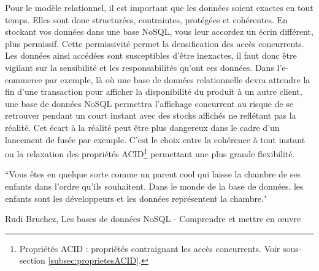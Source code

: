 Pour le modèle relationnel, il est important que les données soient exactes en tout temps. Elles sont donc structurées, contraintes, protégées et cohérentes. En stockant vos données dans une base NoSQL, vous leur accordez un écrin différent, plus permissif. Cette permissivité permet la densification des accès concurrents. Les données ainsi accédées sont susceptibles d'être inexactes, il faut donc être vigilant sur la sensibilité et les responsabilités qu'ont ces données. Dans l'e-commerce par exemple, là où une base de données relationnelle devra attendre la fin d'une transaction pour afficher la disponibilité du produit à un autre client, une base de données NoSQL permettra l'affichage concurrent au risque de se retrouver pendant un court instant avec des stocks affichés ne reflétant pas la réalité. Cet écart à la réalité peut être plus dangereux dans le cadre d'un lancement de fusée par exemple. C'est le choix entre la cohérence à tout instant ou la relaxation des propriétés ACID\footnote{Propriétés ACID : propriétés contraignant les accès concurrents. Voir sous-section \ref{subsec:proprietesACID}.} permettant une plus grande flexibilité. 
\epigraph{``Vous êtes en quelque sorte comme un parent cool qui laisse la chambre de ses enfants dans l'ordre qu'ils souhaitent. Dans le monde de la base de données, les enfants sont les développeurs et les données représentent la chambre."}{\textup{Rudi Bruchez}, Les bases de données NoSQL - Comprendre et mettre en œuvre \cite{BD_NoSQL}}
